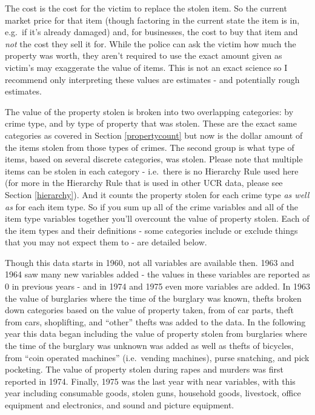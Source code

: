 \documentclass[
  12pt,
  openany]{book}
\begin{document}
The cost is the cost for the victim to replace the stolen item. So the current market price for that item (though factoring in the current state the item is in, e.g.~if it's already damaged) and, for businesses, the cost to buy that item and \emph{not} the cost they sell it for. While the police can ask the victim how much the property was worth, they aren't required to use the exact amount given as victim's may exaggerate the value of items. This is not an exact science so I recommend only interpreting these values are estimates - and potentially rough estimates.

The value of the property stolen is broken into two overlapping categories: by crime type, and by type of property that was stolen. These are the exact same categories as covered in Section \ref{propertycount} but now is the dollar amount of the items stolen from those types of crimes. The second group is what type of items, based on several discrete categories, was stolen. Please note that multiple items can be stolen in each category - i.e.~there is no Hierarchy Rule used here (for more in the Hierarchy Rule that is used in other UCR data, please see Section \ref{hierarchy}). And it counts the property stolen for each crime type \emph{as well as} for each item type. So if you sum up all of the crime variables and all of the item type variables together you'll overcount the value of property stolen. Each of the item types and their definitions - some categories include or exclude things that you may not expect them to - are detailed below.

Though this data starts in 1960, not all variables are available then. 1963 and 1964 saw many new variables added - the values in these variables are reported as 0 in previous years - and in 1974 and 1975 even more variables are added. In 1963 the value of burglaries where the time of the burglary was known, thefts broken down categories based on the value of property taken, from of car parts, theft from cars, shoplifting, and ``other'' thefts was added to the data. In the following year this data began including the value of property stolen from burglaries where the time of the burglary was unknown was added as well as thefts of bicycles, from ``coin operated machines'' (i.e.~vending machines), purse snatching, and pick pocketing. The value of property stolen during rapes and murders was first reported in 1974. Finally, 1975 was the last year with near variables, with this year including consumable goods, stolen guns, household goods, livestock, office equipment and electronics, and sound and picture equipment.
\end{document}
